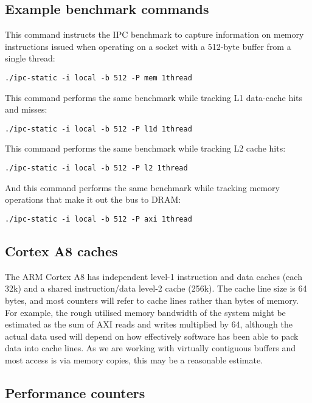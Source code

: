 \documentclass[a4paper,10pt]{article}
\begin{document}
\subsection*{Example benchmark commands}

This command instructs the IPC benchmark to capture information on memory
instructions issued when operating on a socket with a 512-byte buffer from a
single thread:

\begin{verbatim}
./ipc-static -i local -b 512 -P mem 1thread
\end{verbatim}

\noindent
This command performs the same benchmark while tracking L1 data-cache hits and
misses:

\begin{verbatim}
./ipc-static -i local -b 512 -P l1d 1thread
\end{verbatim}

\noindent
This command performs the same benchmark while tracking L2 cache hits:

\begin{verbatim}
./ipc-static -i local -b 512 -P l2 1thread
\end{verbatim}

\noindent
And this command performs the same benchmark while tracking memory operations
that make it out the bus to DRAM:

\begin{verbatim}
./ipc-static -i local -b 512 -P axi 1thread
\end{verbatim}

\subsection*{Cortex A8 caches}

The ARM Cortex A8 has independent level-1 instruction and data caches (each
32k) and a shared instruction/data level-2 cache (256k).
The cache line size is 64 bytes, and most counters will refer to cache lines
rather than bytes of memory.
For example, the rough utilised memory bandwidth of the system might be
estimated as the sum of AXI reads and writes multiplied by 64, although the
actual data used will depend on how effectively software has been able to pack
data into cache lines.
As we are working with virtually contiguous buffers and most access is via
memory copies, this may be a reasonable estimate.

\subsection*{Performance counters}
\end{document}
